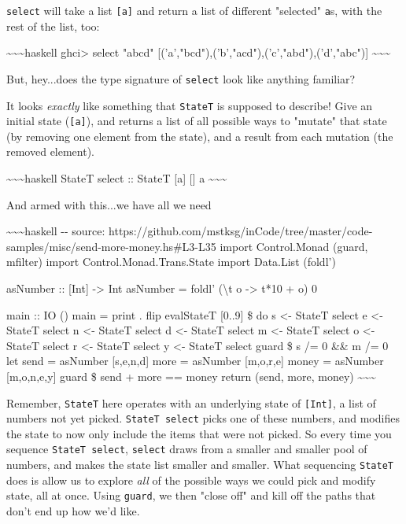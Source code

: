 \documentclass[]{article}
\begin{document}
\texttt{select} will take a list \texttt{{[}a{]}} and return a list of different
"selected" \texttt{a}s, with the rest of the list, too:

\textasciitilde{}\textasciitilde{}\textasciitilde{}haskell ghci\textgreater{}
select "abcd" {[}('a',"bcd"),('b',"acd"),('c',"abd"),('d',"abc"){]}
\textasciitilde{}\textasciitilde{}\textasciitilde{}

But, hey...does the type signature of \texttt{select} look like anything
familiar?

It looks \emph{exactly} like something that \texttt{StateT} is supposed to
describe! Give an initial state (\texttt{{[}a{]}}), and returns a list of all
possible ways to "mutate" that state (by removing one element from the state),
and a result from each mutation (the removed element).

\textasciitilde{}\textasciitilde{}\textasciitilde{}haskell StateT select ::
StateT {[}a{]} {[}{]} a \textasciitilde{}\textasciitilde{}\textasciitilde{}

And armed with this...we have all we need

\textasciitilde{}\textasciitilde{}\textasciitilde{}haskell -\/- source:
https://github.com/mstksg/inCode/tree/master/code-samples/misc/send-more-money.hs\#L3-L35
import Control.Monad (guard, mfilter) import Control.Monad.Trans.State import
Data.List (foldl')

asNumber :: {[}Int{]} -\textgreater{} Int asNumber = foldl' (\textbackslash{}t o
-\textgreater{} t*10 + o) 0

main :: IO () main = print . flip evalStateT {[}0..9{]} \$ do s \textless{}-
StateT select e \textless{}- StateT select n \textless{}- StateT select d
\textless{}- StateT select m \textless{}- StateT select o \textless{}- StateT
select r \textless{}- StateT select y \textless{}- StateT select guard \$ s /= 0
\&\& m /= 0 let send = asNumber {[}s,e,n,d{]} more = asNumber {[}m,o,r,e{]}
money = asNumber {[}m,o,n,e,y{]} guard \$ send + more == money return (send,
more, money) \textasciitilde{}\textasciitilde{}\textasciitilde{}

Remember, \texttt{StateT} here operates with an underlying state of
\texttt{{[}Int{]}}, a list of numbers not yet picked. \texttt{StateT\ select}
picks one of these numbers, and modifies the state to now only include the items
that were not picked. So every time you sequence \texttt{StateT\ select},
\texttt{select} draws from a smaller and smaller pool of numbers, and makes the
state list smaller and smaller. What sequencing \texttt{StateT} does is allow us
to explore \emph{all} of the possible ways we could pick and modify state, all
at once. Using \texttt{guard}, we then "close off" and kill off the paths that
don't end up how we'd like.
\end{document}
